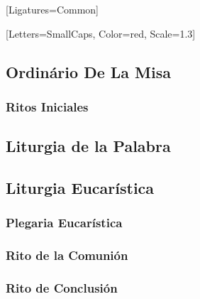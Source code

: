 

\newfontfamily{}

\newfontfamily{}[Ligatures={Common}]

\newfontfamily{}[Letters=SmallCaps, Color=red, Scale=1.3]

\setlength{\parskip}{.3em}
\setbeforesubsecskip{1em}
\setaftersubsecskip{1em}



\begin{spanish}
\chapter[Ordinário De La Misa][Ordinário De La Misa]{Ordinário De La Misa}
\subsection*{Ritos Iniciales}



\section[Liturgia de la Palabra]{Liturgia de la Palabra}

\section[Liturgia Eucarística]{Liturgia Eucarística}


\subsection*{Plegaria Eucarística}


\subsection*{Rito de la Comunión}


\subsection*{Rito de Conclusión}

\end{spanish}

